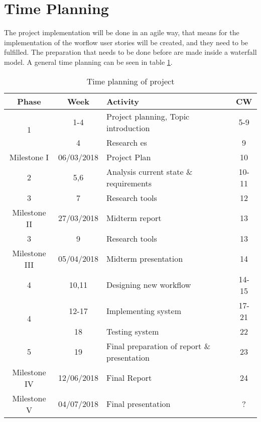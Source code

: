 \section{Time Planning}
The project implementation will be done in an agile way, that means for the implementation of the worflow user stories will be created, and they need to be fulfilled. The preparation that needs to be done before are made inside a waterfall model. A general time planning can be seen in table \ref{tab:timeplanning}. 
\begin{table} [h]
	\centering
	\begin{tabular}{|c|c|l|c|} \hline
		\rowcolor{Gray}Phase & Week & Activity & CW \\ \hline
		\multirow{2}{*}{1} & 1-4 & Project planning, Topic introduction & 5-9 \\
		& 4 & Research \gls{es} & 9 \\	\hline	
		Milestone I & 06/03/2018 & Project Plan & 10\\ \hline
		2 & 5,6 & Analysis current state \& requirements & 10-11  \\ \hline
		3 & 7 & Research tools & 12 \\ \hline
		Milestone II & 27/03/2018 & Midterm report & 13\\ \hline
		3 & 9 & Research tools & 13 \\ \hline
		Milestone III & 05/04/2018 & Midterm presentation & 14 \\ \hline
		4 & 10,11 & Designing new workflow & 14-15 \\
		\multirow{2}{*}{4} & 12-17 & Implementing system & 17-21 \\
		& 18 & Testing system & 22 \\ \hline
		5 & 19 & Final preparation of report \& presentation & 23 \\ \hline
		Milestone IV & 12/06/2018 & Final Report & 24\\ \hline
		Milestone V & 04/07/2018 & Final presentation & ? \\ \hline
	\end{tabular}
	\caption{Time planning of project}
	\label{tab:timeplanning}
\end{table}

